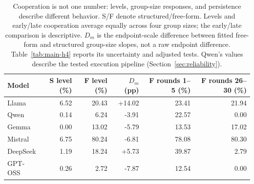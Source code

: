 \begin{table}[t]
\centering\small
\begin{tabular}{lrrrrr}
\toprule
Model & S level (\%) & F level (\%) & $D_m$ (pp) & F rounds 1--5 (\%) & F rounds 26--30 (\%) \\
\midrule
Llama & 6.52 & 20.43 & +14.02 & 23.41 & 21.94 \\
Qwen & 0.14 & 6.24 & -3.91 & 22.57 & 0.00 \\
Gemma & 0.00 & 13.02 & -5.79 & 13.53 & 17.02 \\
Mistral & 6.75 & 80.24 & -6.81 & 78.08 & 80.30 \\
DeepSeek & 1.19 & 18.24 & +5.73 & 39.87 & 2.79 \\
GPT-OSS & 0.26 & 2.72 & -7.87 & 12.54 & 0.00 \\
\bottomrule
\end{tabular}
\caption{Cooperation is not one number: levels, group-size responses, and persistence describe different behavior. S/F denote structured/free-form. Levels and early/late cooperation average equally across four group sizes; the early/late comparison is descriptive. $D_m$ is the endpoint-scale difference between fitted free-form and structured group-size slopes, not a raw endpoint difference. Table~\ref{tab:main-h4} reports its uncertainty and adjusted tests. Qwen's values describe the tested execution pipeline (Section~\ref{sec:reliability}).}
\label{tab:measurement-grid}
\end{table}
